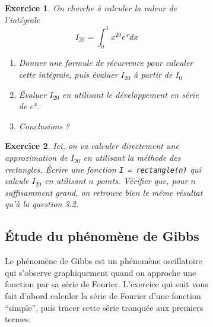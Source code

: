 \documentclass[a4paper,11pt]{article}
\newtheorem{exo}{Exercice}
\begin{document}
\begin{figure}
\begin{figure}
\begin{exo} On cherche à calculer la valeur de l'intégrale
  \begin{equation*}
    I_{20} = \int_0^1 x^{20} e^{x} dx
  \end{equation*}
  \begin{enumerate}
  \item Donner une formule de récurrence pour calculer cette intégrale, puis évaluer $I_{20}$
    à partir de $I_0$
  \item Évaluer $I_{20}$ en utilisant le développement en série de $e^x$.
  \item Conclusions ?
  \end{enumerate}
\end{exo}

\begin{exo} Ici, on va calculer directement une approximation de
  $I_{20}$ en utilisant la méthode des rectangles.  Écrire une fonction
  {\tt I = rectangle(n)} qui calcule $I_{20}$ en utilisant $n$
  points. Vérifier que, pour $n$ suffisamment grand, on retrouve bien le
  même résultat qu'à la question 3.2.
\end{exo}


\subsection{Étude du phénomène de Gibbs}

Le phénomène de Gibbs est un phénomène oscillatoire qui s'observe
graphiquement quand on approche une fonction par sa série de
Fourier. L'exercice qui suit vous fait d'abord calculer la série de
Fourier d'une fonction ``simple'', puis tracer cette série tronquée
aux premiers termes.


\end{figure}
\end{figure}
\end{document}
